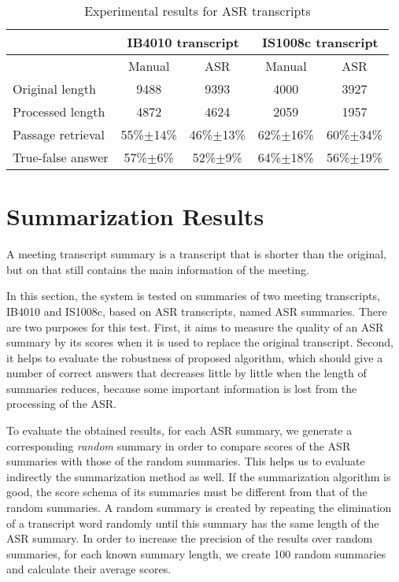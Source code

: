 \begin{table}[htbp]
\caption{Experimental results for ASR transcripts}
\begin{tabular}{|l|c|c|c|c|}
\hline
\multicolumn{1}{|c|}{} & \multicolumn{ 2}{c|}{IB4010 transcript} & \multicolumn{ 2}{c|}{IS1008c transcript} \\ \hline
\multicolumn{1}{|c|}{} & Manual & ASR & Manual & ASR \\ \hline
Original length & 9488 & 9393 & 4000 & 3927 \\ \hline
Processed length & 4872 & 4624 & 2059 & 1957 \\ \hline
Passage retrieval & 55\%\ensuremath{\pm}14\% & 46\%\ensuremath{\pm}13\% & 62\%\ensuremath{\pm}16\% & 60\%\ensuremath{\pm}34\% \\ \hline
True-false answer & 57\%\ensuremath{\pm}6\% & 52\%\ensuremath{\pm}9\% & 64\%\ensuremath{\pm}18\% & 56\%\ensuremath{\pm}19\% \\ \hline
\end{tabular}
\label{results for ASR transcripts}
\end{table}



\section{Summarization Results}

A meeting transcript summary is a transcript that is shorter than the original, but on that still contains the main information of the meeting.

In this section, the system is tested on summaries of two meeting transcripts, IB4010 and IS1008c, based on ASR transcripts, named ASR summaries. There are two purposes for this test. First, it aims to measure the quality of an ASR summary by its scores when it is used to replace the original transcript. Second, it helps to evaluate the robustness of proposed algorithm, which should give a number of correct answers that decreases little by little when the length of summaries reduces, because some important information is lost from the processing of the ASR.

To evaluate the obtained results, for each ASR summary, we generate a corresponding \textit{random} summary in order to compare scores of the ASR summaries with those of the random summaries. This helps us to evaluate indirectly the summarization method as well. If the summarization algorithm is good, the score schema of its summaries must be different from that of the random summaries. A random summary is created by repeating the elimination of a transcript word randomly until this summary has the same length of the ASR summary. In order to increase the precision of the results over random summaries, for each known summary length, we create 100 random summaries and calculate their average scores.

